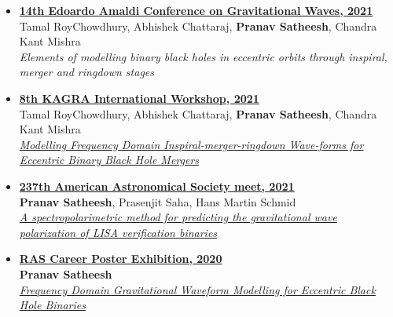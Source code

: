 \documentclass[margin, centered]{res}
\begin{document}
\begin{resume}
\begin{itemize}[leftmargin=*]
    \item \href{https://www.amaldi14.org/}{\textbf{14th Edoardo Amaldi Conference on Gravitational Waves, 2021}}\\
    Tamal RoyChowdhury, Abhishek Chattaraj, \textbf{Pranav Satheesh}, Chandra Kant Mishra\\
    \textit{Elements of modelling binary black holes in eccentric orbits through inspiral, merger and ringdown stages}
    
    \item \href{http://kiw8.org/program/}{\textbf{8th KAGRA International Workshop, 2021}}\\
    Tamal RoyChowdhury, Abhishek Chattaraj, \textbf{Pranav Satheesh}, Chandra Kant Mishra\\
    \href{http://kiw8.org/data/users/348932af5b3e54a8958255b121ccef68/poster/50_pranavsatheesh-poster.pdf}{\textit{Modelling Frequency Domain Inspiral-merger-ringdown Wave-forms for Eccentric Binary Black Hole Mergers}}
    
    \item \href{https://aas.org/meetings/aas237}{\textbf{237th American Astronomical Society meet, 2021}}\\
    \textbf{Pranav Satheesh}, Prasenjit Saha, Hans Martin Schmid \\
    \href{aas237-aas.ipostersessions.com/Default.aspx?s=79-64-0C-43-B0-53-8B-48-C7-A1-41-CE-DF-A9-70-2A}{\textit{A spectropolarimetric method for predicting the gravitational wave polarization of LISA verification binaries}}
    
     \item \href{https://ras.ac.uk/ras-2020-posters}{\textbf{RAS Career Poster Exhibition, 2020}}\\
    \textbf{Pranav Satheesh} \\
    \href{https://ras.ac.uk/poster-contest/pranav-satheesh}{\textit{Frequency Domain Gravitational Waveform Modelling for Eccentric Black Hole Binaries}}\\ 
    

\end{itemize}   


\end{resume}
\end{document}
